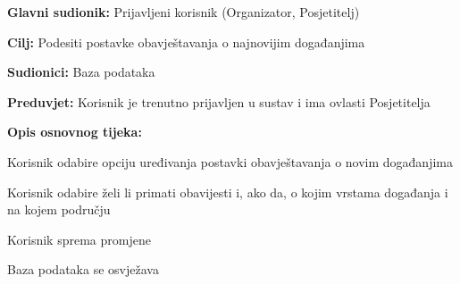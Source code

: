 					\noindent {}
					\begin{packed_item}
						
						\item \textbf{Glavni sudionik:} Prijavljeni korisnik (Organizator, Posjetitelj)
						\item  \textbf{Cilj:} Podesiti postavke obavještavanja o najnovijim događanjima
						\item  \textbf{Sudionici:} Baza podataka
						\item  \textbf{Preduvjet:} Korisnik je trenutno prijavljen u sustav i ima ovlasti Posjetitelja
						\item  \textbf{Opis osnovnog tijeka:}
						
						\item[] \begin{packed_enum}
							
							\item Korisnik odabire opciju uređivanja postavki obavještavanja o novim događanjima
							\item Korisnik odabire želi li primati obavijesti i, ako da, o kojim vrstama događanja i na kojem području
							\item Korisnik sprema promjene
							\item Baza podataka se osvježava
							
						\end{packed_enum}
						
						
							
								
								
						
					\end{packed_item}
					
